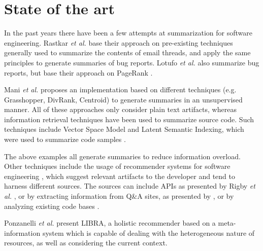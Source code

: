 \section{State of the art}\label{sec:stateOfTheArt}
In the past years there have been a few attempts at summarization for software engineering. Rastkar \textit{et al.} \cite{A4} base their approach on pre-existing techniques generally used to summarize the contents of email threads, and apply the same principles to generate summaries of bug reports. Lotufo \textit{et al.} \cite{A5} also summarize bug reports, but base their approach on PageRank \cite{ilprints422}. 

Mani \textit{et al.} \cite{A7} proposes an implementation based on different techniques (e.g. Grasshopper, DivRank, Centroid) to generate summaries in an unsupervised manner. All of these approaches only consider plain text artifacts, whereas information retrieval techniques have been used to summarize source code. Such techniques include Vector Space Model and Latent Semantic Indexing, which were used to summarize code samples \cite{A8} \cite{A9}. 

The above examples all generate summaries to reduce information overload. Other techniques include the usage of recommender systems for software engineering \cite{B3}, which suggest relevant artifacts to the developer and tend to harness different sources. The sources can include APIs as presented by Rigby \textit{et al.} \cite{B4} \cite{B5}, or by extracting information from Q\&A sites, as presented by \cite{B6}, or by analyzing existing code bases \cite{B7} \cite{B8} \cite{B9} \cite{B10}. 

Ponzanelli \textit{et al.} \cite{Ponz2017a} present LIBRA, a holistic recommender based on a meta-information system which is capable of dealing with the heterogeneous nature of resources, as well as considering the current context.
